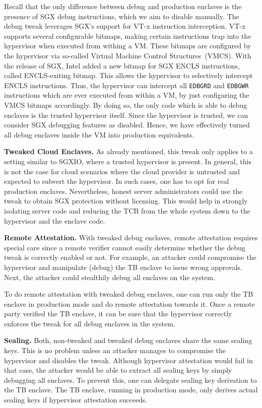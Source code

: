 \documentclass{sig-alternate-05-2015}
\newcommand{\VTx}{\mbox{VT-x}}
\begin{document}
Recall that the only difference between debug and production enclaves is the presence of SGX debug instructions, which we aim to disable manually.
The debug tweak leverages SGX's support for \VTx{} instruction interception. 
\VTx{} supports several configurable bitmaps, making certain instructions trap into the hypervisor when executed from withing a VM. 
These bitmaps are configured by the hypervisor via so-called Virtual Machine Control Structures~(VMCS). 
With the release of SGX, Intel added a new bitmap for SGX ENCLS instructions, called ENCLS-exiting bitmap. 
This allows the hypervisor to selectively intercept ENCLS instructions. 
Thus, the hypervisor can intercept all \verb!EDBGRD! and \verb!EDBGWR! instructions which are ever executed from within a VM, by just configuring the VMCS bitmaps accordingly. 
By doing so, the only code which is able to debug enclaves is the trusted hypervisor itself. 
Since the hypervisor is trusted, we can consider SGX debugging features as disabled. 
Hence, we have effectively turned all debug enclaves inside the VM into production equivalents.

\textbf{Tweaked Cloud Enclaves.}
As already mentioned, this tweak only applies to a setting similar to SGXIO, where a trusted hypervisor is present. 
In general, this is not the case for cloud scenarios where the cloud provider is untrusted and expected to subvert the hypervisor. 
In such cases, one has to opt for real production enclaves. 
Nevertheless, honest server administrators could use the tweak to obtain SGX protection without licensing. 
This would help in strongly isolating server code and reducing the TCB from the whole system down to the hypervisor and the enclave code.

\textbf{Remote Attestation.}
With tweaked debug enclaves, remote attestation requires special care since a remote verifier cannot easily determine whether the debug tweak is correctly enabled or not. 
For example, an attacker could compromise the hypervisor and manipulate (debug) the TB enclave to issue wrong approvals. 
Next, the attacker could stealthily debug all enclaves on the system. 

To do remote attestation with tweaked debug enclaves, one can run only the TB enclave in production mode and do remote attestation towards it. 
Once a remote party verified the TB enclave, it can be sure that the hypervisor correctly enforces the tweak for all debug enclaves in the system.

\textbf{Sealing.}
Both, non-tweaked and tweaked debug enclaves share the same sealing keys. 
This is no problem unless an attacker manages to compromise the hypervisor and disables the tweak. 
Although hypervisor attestation would fail in that case, the attacker would be able to extract all sealing keys by simply debugging all enclaves. 
To prevent this, one can delegate sealing key derivation to the TB enclave. 
The TB enclave, running in production mode, only derives actual sealing keys if hypervisor attestation succeeds.
\end{document}
